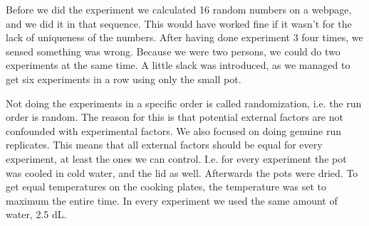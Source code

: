 Before we did the experiment we calculated 16 random numbers on a webpage, and we did it in that sequence. This would have worked fine if it wasn't for the lack of uniqueness of the numbers. After having done experiment 3 four times, we sensed something was wrong. Because we were two persons, we could do two experiments at the same time. A little slack was introduced, as we managed to get six experiments in a row using only the small pot.

Not doing the experiments in a specific order is called randomization, i.e. the run order is random. The reason for this is that potential external factors are not confounded with experimental factors.  We also focused on doing genuine run replicates. This means that all external factors should be equal for every experiment, at least the ones we can control. I.e. for every experiment the pot was cooled in cold water, and the lid as well. Afterwards the pots were dried. To get equal temperatures on the cooking plates, the temperature was set to maximum the entire time. In every experiment we used the same amount of water, 2.5 dL.